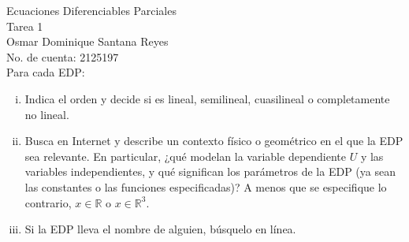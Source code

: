 \documentclass[fleqn]{article}
\newcommand{\real}{\mathbb{R}}
\begin{document}
	\bfseries

	Ecuaciones Diferenciables Parciales \\
	Tarea 1 \\
	Osmar Dominique Santana Reyes \\
	No. de cuenta: 2125197 \\

	Para cada EDP:

	\begin{enumerate}[(i)]
		\item Indica el orden y decide si es lineal, semilineal, cuasilineal o completamente no lineal.
		\item Busca en Internet y describe un contexto físico o geométrico en el que la EDP sea relevante. En particular, ¿qué modelan la variable dependiente $ U $ y las variables independientes, y qué significan los parámetros de la EDP (ya sean las constantes o las funciones especificadas)? A menos que se especifique lo contrario, $ x \in \real $ o $ x \in \real^3 $.
		\item Si la EDP lleva el nombre de alguien, búsquelo en línea.
	\end{enumerate}

	\normalfont
\end{document}

